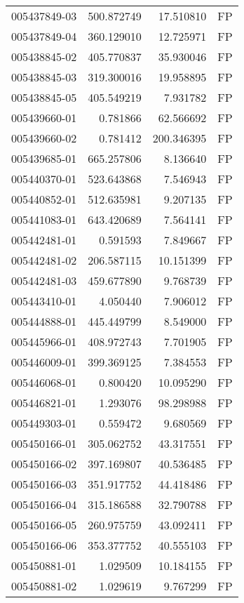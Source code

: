 \begin{tabular}{lrrl}
005437849-03 &  500.872749 &    17.510810 &   FP \\
005437849-04 &  360.129010 &    12.725971 &   FP \\
005438845-02 &  405.770837 &    35.930046 &   FP \\
005438845-03 &  319.300016 &    19.958895 &   FP \\
005438845-05 &  405.549219 &     7.931782 &   FP \\
005439660-01 &    0.781866 &    62.566692 &   FP \\
005439660-02 &    0.781412 &   200.346395 &   FP \\
005439685-01 &  665.257806 &     8.136640 &   FP \\
005440370-01 &  523.643868 &     7.546943 &   FP \\
005440852-01 &  512.635981 &     9.207135 &   FP \\
005441083-01 &  643.420689 &     7.564141 &   FP \\
005442481-01 &    0.591593 &     7.849667 &   FP \\
005442481-02 &  206.587115 &    10.151399 &   FP \\
005442481-03 &  459.677890 &     9.768739 &   FP \\
005443410-01 &    4.050440 &     7.906012 &   FP \\
005444888-01 &  445.449799 &     8.549000 &   FP \\
005445966-01 &  408.972743 &     7.701905 &   FP \\
005446009-01 &  399.369125 &     7.384553 &   FP \\
005446068-01 &    0.800420 &    10.095290 &   FP \\
005446821-01 &    1.293076 &    98.298988 &   FP \\
005449303-01 &    0.559472 &     9.680569 &   FP \\
005450166-01 &  305.062752 &    43.317551 &   FP \\
005450166-02 &  397.169807 &    40.536485 &   FP \\
005450166-03 &  351.917752 &    44.418486 &   FP \\
005450166-04 &  315.186588 &    32.790788 &   FP \\
005450166-05 &  260.975759 &    43.092411 &   FP \\
005450166-06 &  353.377752 &    40.555103 &   FP \\
005450881-01 &    1.029509 &    10.184155 &   FP \\
005450881-02 &    1.029619 &     9.767299 &   FP \\

\end{tabular}
